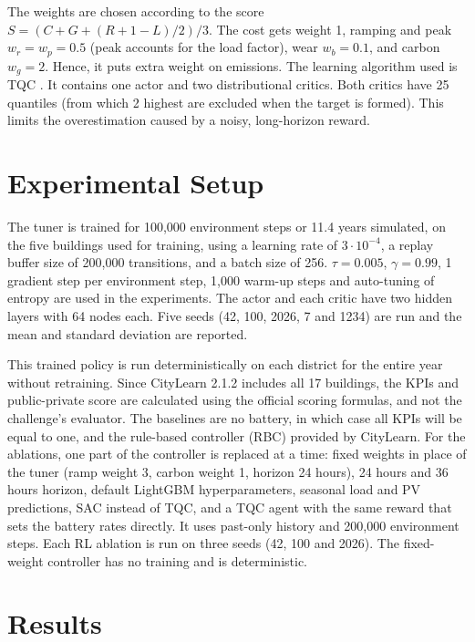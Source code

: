 \documentclass[conference]{IEEEtran}
\begin{document}
The weights are chosen according to the score $S=(C+G+(R+1-L)/2)/3$. The cost gets weight 1, ramping and peak
$w_r = w_p = 0.5$ (peak accounts for the load factor), wear $w_b = 0.1$, and carbon $w_g = 2$. Hence, it puts extra weight
on emissions. The learning algorithm used is TQC \cite{kuznetsov2020tqc}. It contains one actor and two distributional
critics. Both critics have 25 quantiles (from which 2 highest are excluded when the target is formed). This limits the
overestimation caused by a noisy, long-horizon reward.

\section{Experimental Setup}\label{sec:setup}
The tuner is trained for 100{,}000 environment steps or 11.4 years simulated, on the five buildings used for training,
using a learning rate of $3\cdot10^{-4}$, a replay buffer size of 200{,}000 transitions, and a batch size of 256.
$\tau=0.005$, $\gamma=0.99$, 1 gradient step per environment step, 1{,}000 warm-up steps and auto-tuning of entropy are
used in the experiments. The actor and each critic have two hidden layers with 64 nodes each. Five seeds (42, 100, 2026, 7
and 1234) are run and the mean and standard deviation are reported.

This trained policy is run deterministically on each district for the entire year without retraining. Since CityLearn
2.1.2 includes all 17 buildings, the KPIs and public-private score are calculated using the official scoring formulas, and
not the challenge's evaluator. The baselines are no battery, in which case all KPIs will be equal to one, and the
rule-based controller (RBC) provided by CityLearn. For the ablations, one part of the controller is replaced at a time:
fixed weights in place of the tuner (ramp weight 3, carbon weight 1, horizon 24 hours), 24 hours and 36 hours horizon,
default LightGBM hyperparameters, seasonal load and PV predictions, SAC instead of TQC, and a TQC agent with the same
reward that sets the battery rates directly. It uses past-only history and 200{,}000 environment steps. Each RL ablation
is run on three seeds (42, 100 and 2026). The fixed-weight controller has no training and is deterministic.

\section{Results}\label{sec:results}
\end{document}
